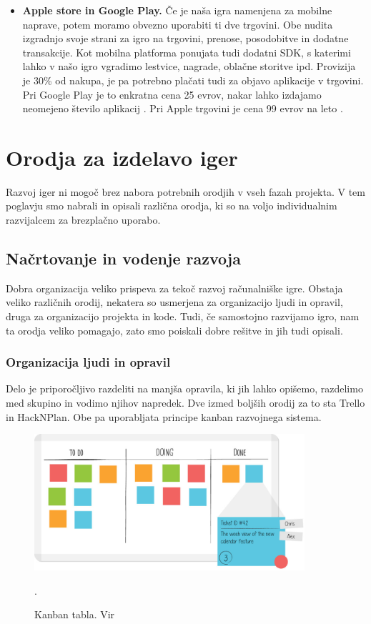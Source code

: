 \documentclass[12pt,a4paper,twoside]{book}
\begin{document}
\begin{itemize}
	\item \textbf{Apple store in Google Play.} Če je naša igra namenjena za mobilne naprave, potem moramo obvezno uporabiti ti dve trgovini. Obe nudita izgradnjo svoje strani za igro na trgovini, prenose, posodobitve in dodatne transakcije. Kot mobilna platforma ponujata tudi dodatni SDK, s katerimi lahko v našo igro vgradimo lestvice, nagrade, oblačne storitve ipd. Provizija je 30\% od nakupa, je pa potrebno plačati tudi za objavo aplikacije v trgovini. Pri Google Play je to enkratna cena 25 evrov, nakar lahko izdajamo neomejeno število aplikacij \cite{googleplay}. Pri Apple trgovini je cena 99 evrov na leto \cite{applestore}.
\end{itemize} 

\chapter{Orodja za izdelavo iger}\thispagestyle{fancy}
Razvoj iger ni mogoč brez nabora potrebnih orodjih v vseh fazah projekta. V tem poglavju smo nabrali in opisali različna orodja, ki so na voljo individualnim razvijalcem za brezplačno uporabo.
\section{Načrtovanje in vodenje razvoja}
Dobra organizacija veliko prispeva za tekoč razvoj računalniške igre. Obstaja veliko različnih orodij, nekatera so usmerjena za organizacijo ljudi in opravil, druga za organizacijo projekta in kode. Tudi, če samostojno razvijamo igro, nam ta orodja veliko pomagajo, zato smo poiskali dobre rešitve in jih tudi opisali.

\subsection{Organizacija ljudi in opravil}
Delo je priporočljivo razdeliti na manjša opravila, ki jih lahko opišemo, razdelimo med skupino in vodimo njihov napredek. Dve izmed boljših orodij za to sta Trello in HackNPlan. Obe pa uporabljata principe kanban razvojnega sistema.

\begin{figure}[h]
	\centering
	\includegraphics[width=10cm]{kanban_guide_print_KPO_bleed_board2}
	\caption{Kanban tabla. Vir \cite{kanbanBoard}}.
	\label{slika:kanbanBoard}
	\vspace*{-2em}
\end{figure}
\end{document}
